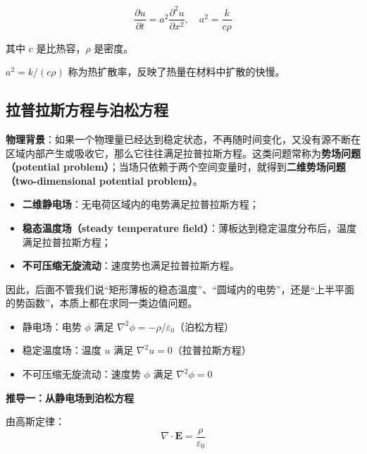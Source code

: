 \begin{zhongyao}[一维热传导方程]
\[
    \frac{\partial u}{\partial t} = a^2\frac{\partial^2 u}{\partial x^2}, \quad a^2 = \frac{k}{c\rho}
\]
\end{zhongyao}

其中 $c$ 是比热容，$\rho$ 是密度。

\begin{wulibj}[物理意义]
$a^2 = k/(c\rho)$ 称为热扩散率，反映了热量在材料中扩散的快慢。
\end{wulibj}

\subsection{拉普拉斯方程与泊松方程}

\textbf{物理背景}：如果一个物理量已经达到稳定状态，不再随时间变化，又没有源不断在区域内部产生或吸收它，那么它往往满足拉普拉斯方程。这类问题常称为\textbf{势场问题（potential problem）}；当场只依赖于两个空间变量时，就得到\textbf{二维势场问题（two-dimensional potential problem）}。

\begin{wulibj}[为什么这一类问题在本课程中很重要]
\begin{itemize}
    \item \textbf{二维静电场}：无电荷区域内的电势满足拉普拉斯方程；
    \item \textbf{稳态温度场（steady temperature field）}：薄板达到稳定温度分布后，温度满足拉普拉斯方程；
    \item \textbf{不可压缩无旋流动}：速度势也满足拉普拉斯方程。
\end{itemize}

因此，后面不管我们说``矩形薄板的稳态温度''、``圆域内的电势''，还是``上半平面的势函数''，本质上都在求同一类边值问题。
\end{wulibj}

\begin{itemize}
    \item 静电场：电势 $\phi$ 满足 $\nabla^2\phi = -\rho/\varepsilon_0$（泊松方程）
    \item 稳定温度场：温度 $u$ 满足 $\nabla^2 u = 0$（拉普拉斯方程）
    \item 不可压缩无旋流动：速度势 $\phi$ 满足 $\nabla^2\phi = 0$
\end{itemize}

\textbf{推导一：从静电场到泊松方程}

由高斯定律：
\begin{equation}
    \nabla \cdot \boldsymbol{E} = \frac{\rho}{\varepsilon_0}
\end{equation}

